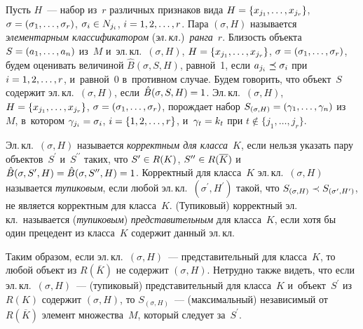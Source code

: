 \begin{multicols}{2}
  Пусть $H$~--- набор из~$r$ различных признаков вида $H\hm= \{x_{j_1}, 
\ldots , x_{j_r}\}$, $\sigma\hm= (\sigma_1, \ldots , \sigma_r)$, $\sigma_i\hm \in 
N_{j_i}$, $i\hm=1,2,\ldots , r$. Пара $(\sigma, H)$ называется 
\textit{элементарным классификатором} (\textit{эл.\,кл.})\ \textit{ранга}~$r$. 
Близость объекта $S\hm= (a_1,\ldots , a_n)$ из~$M$ и~эл.\,кл.\ $(\sigma, H)$, 
$H\hm= \{x_{j_1}, \ldots , x_{j_r}\}$, $\sigma\hm= (\sigma_1, \ldots , \sigma_r)$, 
будем оценивать величиной $\hat{B}(\sigma, S,H)$, равной~1, если 
$a_{j_i}\hm\preceq \sigma_i$ при $i\hm=1,2,\ldots , r$, и~равной~0 в~противном 
случае. Будем говорить, что объект~$S$ содержит эл.\,кл.\ $(\sigma, H)$, если 
$\hat{B}(\sigma, S, H)\hm=1$. Эл.\,кл.\ $(\sigma, H)$, $H\hm= \{x_{j_1}, \ldots , 
x_{j_r}\}$, $\sigma\hm= (\sigma_1,\ldots , \sigma_r)$, порождает набор 
$S_{(\sigma,H)} \hm= (\gamma_1, \ldots , \gamma_n)$ из~$M$, в~котором 
$\gamma_{j_i}\hm= \sigma_i$, $i\hm= \{1,2,\ldots , r\}$, и~$\gamma_t\hm= k_t$ 
при $t\not\in \{j_1,\ldots , j_r\}$.
  
  Эл.\,кл.\ $(\sigma, H)$ называется \textit{корректным для класса}~$K$, если 
нельзя указать пару объектов~$S^\prime$ и~$S^{\prime\prime}$ таких, что 
$S^\prime\hm\in R(K)$, $S^{\prime\prime}\hm\in R(\overline{K})$ 
и~$\hat{B}(\sigma, S^\prime, H)\hm=\hat{B}(\sigma, S^{\prime\prime}, H)\hm= 1$. 
Корректный для класса~$K$ эл.\,кл.\ $(\sigma, H)$ называется 
\textit{тупиковым}, если любой эл.\,кл.\ $(\sigma^\prime, H^\prime)$ такой, что 
$S_{(\sigma, H)} \hm \prec S_{(\sigma^\prime, H^\prime)}$, не является 
корректным для класса~$K$. (Тупиковый) корректный эл.\,кл.\ называется 
(\textit{тупиковым}) \textit{представительным} для класса~$K$, если хотя бы 
один прецедент из класса~$K$ содержит данный эл.\,кл. 
  
  Таким образом, если эл.\,кл.\ $(\sigma, H)$~--- представительный для 
класса~$K$, то любой объект из $R(\overline{K})$ не содержит $(\sigma, H)$. 
Нетрудно также видеть, что если эл.\,кл.\ $(\sigma, H)$~--- (тупиковый) 
представительный для класса~$K$ и~объект~$S^\prime$ из $R(K)$ содержит 
$(\sigma, H)$, то $S_{(\sigma, H)}$~--- (максимальный) независимый от 
$R(\overline{K})$ элемент множества~$M$, который следует за~$S^\prime$.
  

\end{multicols}
